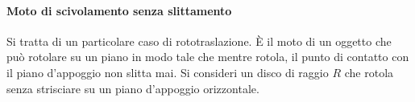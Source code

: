 \documentclass[10pt,a4paper]{book}
\begin{document}
\paragraph{Moto di scivolamento senza slittamento} Si tratta di un particolare caso di rototraslazione. È il moto di un oggetto che può rotolare su un piano in modo tale che mentre rotola, il punto di contatto con il piano d'appoggio non slitta mai. Si consideri un disco di raggio $R$ che rotola senza strisciare su un piano d'appoggio orizzontale.
\begin{figure}[htpb]
	\centering
	

	 
	\tikzset{
	pattern size/.store in=\mcSize, 
	pattern size = 5pt,
	pattern thickness/.store in=\mcThickness, 
	pattern thickness = 0.3pt,
	pattern radius/.store in=\mcRadius, 
	pattern radius = 1pt}
	\makeatletter
	\makeatother

	\begin{tikzpicture}[x=0.75pt,y=0.75pt,yscale=-1,xscale=1]


\end{tikzpicture}
\end{figure}
\end{document}
